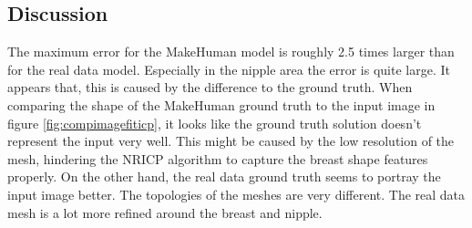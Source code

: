 \subsection{Discussion}
The maximum error for the MakeHuman model is roughly 2.5 times larger than for the real data model. Especially in the nipple area the error is quite large. It appears that, this is caused by the difference to the ground truth. When comparing the shape of the MakeHuman ground truth to the input image in figure \ref{fig:compimagefiticp}, it looks like the ground truth solution doesn't represent the input very well. This might be caused by the low resolution of the mesh, hindering the NRICP algorithm to capture the breast shape features properly. On the other hand, the real data ground truth seems to portray the input image better. The topologies of the meshes are very different. The real data mesh is a lot more refined around the breast and nipple.

